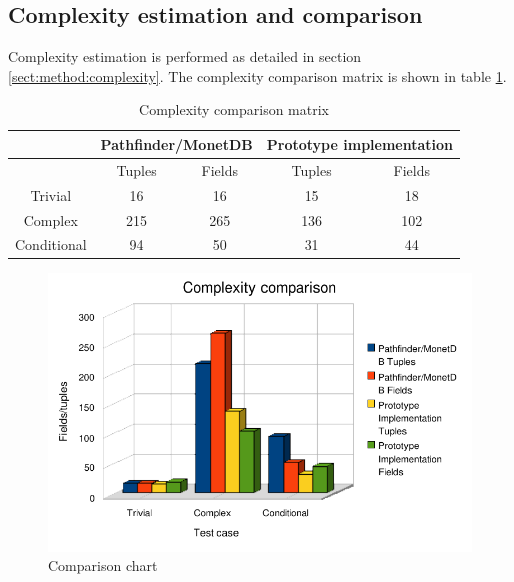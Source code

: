 \newpage
\subsection{Complexity estimation and comparison}
Complexity estimation is performed as detailed in section
\ref{sect:method:complexity}. The complexity
comparison matrix is shown in table \ref{table:result:complexity_matrix}.

\begin{table}[!htp]
 \begin{tabular}{| c | c | c || c | c |}
  \hline
   & \multicolumn{2}{|c||}{\textbf{Pathfinder/MonetDB}}
   & \multicolumn{2}{|c|}{\textbf{Prototype implementation}} \\
   \hline
   & Tuples & Fields & Tuples & Fields \\  
   \hline
   Trivial & 16 & 16 & 15 & 18 \\  
   \hline
   Complex & 215 & 265 & 136 & 102 \\
   \hline
   Conditional & 94 & 50 & 31 & 44 \\  
   \hline
 \end{tabular}
\caption{Complexity comparison matrix}
\label{table:result:complexity_matrix}
\end{table}

\begin{figure}[!htp]
\begin{center}
  \includegraphics[width=1.0\textwidth]{diagrams/comparison_chart}
  \caption{Comparison chart}
  \label{fig:results:comparison:chart}
\end{center}
\end{figure}